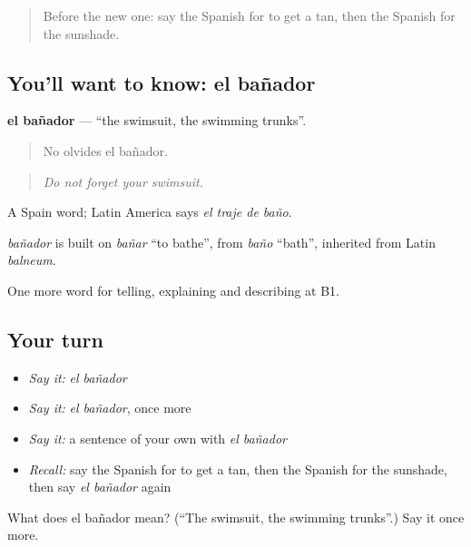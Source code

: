 \begin{quote}
Before the new one: say the Spanish for to get a tan, then the Spanish for the sunshade.
\end{quote}

\subsection*{You'll want to know: el bañador}
\textbf{el bañador} — \textquotedblleft{}the swimsuit, the swimming trunks\textquotedblright{}.

\begin{quote}
No olvides el bañador.
\end{quote}

\begin{quote}
\emph{Do not forget your swimsuit.}
\end{quote}

A Spain word; Latin America says \emph{el traje de baño}.

\begin{cousinweb}
\emph{bañador} is built on \emph{bañar} \textquotedblleft{}to bathe\textquotedblright{}, from \emph{baño} \textquotedblleft{}bath\textquotedblright{}, inherited from Latin \emph{balneum}.
\end{cousinweb}

\begin{grammarlens}[title={What you've built}]
One more word for telling, explaining and describing at B1.
\end{grammarlens}

\subsection*{Your turn}
\begin{itemize}
\raggedright
  \item \emph{Say it:} \emph{el bañador}
  \item \emph{Say it:} \emph{el bañador}, once more
  \item \emph{Say it:} a sentence of your own with \emph{el bañador}
  \item \emph{Recall:} say the Spanish for to get a tan, then the Spanish for the sunshade, then say \emph{el bañador} again
\end{itemize}

\begin{tcolorbox}[breakable,colback=teal!4,colframe=teal!35!black,title={Before you move on}]
What does el bañador mean? (\textquotedblleft{}The swimsuit, the swimming trunks\textquotedblright{}.) Say it once more.
\end{tcolorbox}

